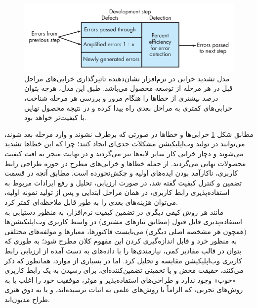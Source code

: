 \begin{figure}[H]
	\centering\includegraphics[width=12cm]{Resources/defect.PNG}
	\caption[مدل تشدید خرابی در نرم‌افزار]
	{مدل تشدید خرابی در نرم‌افزار
		\cite{pressman_software_2015}
		نشان‌دهنده تاثیرگذاری خرابی‌های مراحل قبل در هر مرحله از توسعه محصول می‌باشد. طبق این مدل، هرچه بتوان درصد بیشتری از خطاها را هنگام مرور و بررسی هر مرحله شناخت، خرابی‌های کمتری به مراحل بعدی راه پیدا کرده و در نتیجه محصول نهایی با کیفیت‌تر خواهد بود.
	}
	\label{fig:defect}
\end{figure}
مطابق شکل
\ref{fig:defect}
خرابی‌ها و خطاها در صورتی که برطرف نشوند و وارد مرحله بعد شوند، می‌توانند در تولید وب‌اپلیکیشن مشکلات جدی‌ای ایجاد کنند؛ چرا که این خطاها تشدید می‌شوند و دچار خرابی کار سایر لایه‌ها نیز می‌گردند و در نهایت منجر به افت کیفیت محصولات نهایی می‌گردند. از جمله خطاها و خرابی‌های مطرح در حوزه طراحی رابط کاربری، ناکارآمد بودن ایده‌های اولیه و چکش‌نخورده است. مطابق آنچه در قسمت تضمین و کنترل کیفیت گفته شد، در صورت ارزیابی، تحلیل و رفع ایرادات مربوط به استفاده‌پذیری رابط کاربری، در همان مراحل ابتدایی و پس از تولید نمونه‌ اولیه، می‌توان هزینه‌های بعدی را به طور قابل ملاحظه‌ای کمتر کرد.\\
مانند هر روش کیفی دیگری در تضمین کیفیت نرم‌افزار، به منظور دستیابی به استفاده‌پذیری قابل قبول (مطابق نیازهای مشتری) در واسط کاربری وب‌اپلیکیشن‌ها (همچون هر مشخصه اصلی دیگری) می‌بایست فاکتورها، معیارها و مولفه‌های مختلفی به منظور خرد و قابل اندازه‌گیری کردن این مفهوم کلان مطرح شود؛ به طوری که بتوان در قالب مقادیر کمی، نیازمندی‌ها را با داده‌های به دست آمده از ارزیابی رابط کاربری وب‌اپلیکیشن مقایسه و تحلیل کرد. اما در بسیاری از موارد، همانطور که
\cite{agarwal_assessing_2002,p._miguel_review_2014, albert_measuring_2013}
ذکر می‌کنند، حقیقت محض و یا تخمینی تضمین‌کننده‌ای، برای رسیدن به یک رابط کاربری «خوب» وجود ندارد و طراحی‌های استفاده‌پذیر و موثر، موفقیت خود را اغلب یا به روش‌های تجربی، که الزاماً با روش‌های علمی به اثبات نرسیده‌اند، و یا به ذوق هنری طراح مدیون‌اند.
